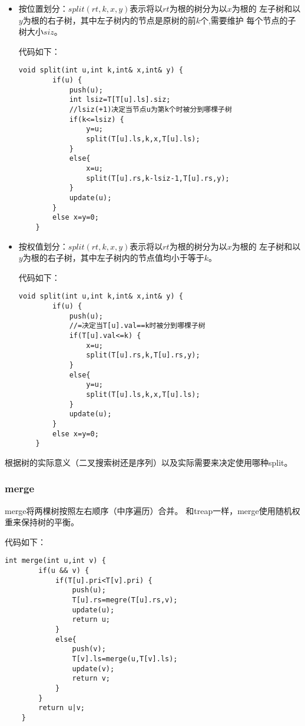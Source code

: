 \begin{itemize}
	\item
	      按位置划分：$split(rt,k,x,y)$表示将以$rt$为根的树分为以$x$为根的
	      左子树和以$y$为根的右子树，其中左子树内的节点是原树的前$k$个,需要维护
	      每个节点的子树大小$siz$。

	      代码如下：
	      \begin{lstlisting}[title=splitKth]
    void split(int u,int k,int& x,int& y) {
        if(u) {
            push(u);
            int lsiz=T[T[u].ls].siz;
            //lsiz(+1)决定当节点u为第k个时被分到哪棵子树
            if(k<=lsiz) {
                y=u;
                split(T[u].ls,k,x,T[u].ls);
            }
            else{
                x=u;
                split(T[u].rs,k-lsiz-1,T[u].rs,y);
            }
            update(u);
        }
        else x=y=0;
    }
\end{lstlisting}
	\item
	      按权值划分：$split(rt,k,x,y)$表示将以$rt$为根的树分为以$x$为根的
	      左子树和以$y$为根的右子树，其中左子树内的节点值均小于等于$k$。

	      代码如下：
	      \begin{lstlisting}[title=splitKey]
    void split(int u,int k,int& x,int& y) {
        if(u) {
            push(u);
            //=决定当T[u].val==k时被分到哪棵子树
            if(T[u].val<=k) {
                x=u;
                split(T[u].rs,k,T[u].rs,y);
            }
            else{
                y=u;
                split(T[u].ls,k,x,T[u].ls);
            }
            update(u);
        }
        else x=y=0;
    }
\end{lstlisting}
\end{itemize}

根据树的实际意义（二叉搜索树还是序列）以及实际需要来决定使用哪种split。

\subsubsection{merge}

merge将两棵树按照左右顺序（中序遍历）合并。
和treap一样，merge使用随机权重来保持树的平衡。

代码如下：

\begin{lstlisting}[title=merge]
    int merge(int u,int v) {
        if(u && v) {
            if(T[u].pri<T[v].pri) {
                push(u);
                T[u].rs=megre(T[u].rs,v);
                update(u);
                return u;
            }
            else{
                push(v);
                T[v].ls=merge(u,T[v].ls);
                update(v);
                return v;
            }
        }
        return u|v;
    }
\end{lstlisting}

